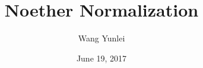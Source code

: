 \documentclass{amsart}
\theoremstyle{plain}
\theoremstyle{definition}
\theoremstyle{remark}
\numberwithin{equation}{section}
\begin{document}
	\title[Complete-simple distributive lattices]
	{Noether Normalization}
	\author{Wang Yunlei}
	\date{June 19, 2017}
	
	\maketitle
	
\end{document}
